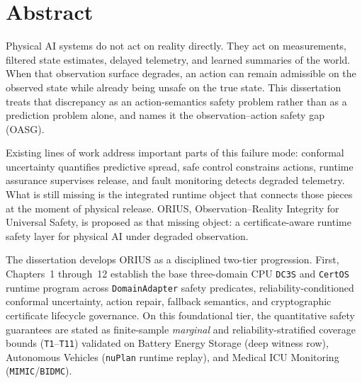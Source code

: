 \chapter*{Abstract}

Physical AI systems do not act on reality directly. They act on measurements, filtered
state estimates, delayed telemetry, and learned summaries of the world. When that
observation surface degrades, an action can remain admissible on the observed state while
already being unsafe on the true state. This dissertation treats that discrepancy as an
action-semantics safety problem rather than as a prediction problem alone, and names it the
observation--action safety gap (OASG).

Existing lines of work address important parts of this failure mode: conformal uncertainty
quantifies predictive spread, safe control constrains actions, runtime assurance supervises
release, and fault monitoring detects degraded telemetry. What is still missing is the
integrated runtime object that connects those pieces at the moment of physical release.
ORIUS, Observation--Reality Integrity for Universal Safety, is proposed as that missing
object: a certificate-aware runtime safety layer for physical AI under degraded
observation.

The dissertation develops ORIUS as a disciplined two-tier progression. First, Chapters~1
through~12 establish the base three-domain CPU \texttt{DC3S} and \texttt{CertOS} runtime
program across \texttt{DomainAdapter} safety predicates, reliability-conditioned conformal
uncertainty, action repair, fallback semantics, and cryptographic certificate lifecycle
governance. On this foundational tier, the quantitative safety guarantees are stated as
finite-sample \emph{marginal} and reliability-stratified coverage bounds (\texttt{T1}--\texttt{T11})
validated on Battery Energy Storage (deep witness row), Autonomous Vehicles (\texttt{nuPlan}
runtime replay), and Medical ICU Monitoring (\texttt{MIMIC}/\texttt{BIDMC}).

